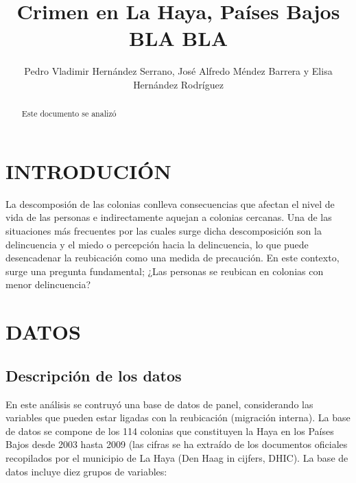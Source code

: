 \documentclass[letterpaper, 10 pt, conference]{ieeeconf}  %
\title{\LARGE \bf
Crimen en La Haya, Pa\'ises Bajos BLA BLA
}
\author{Pedro Vladimir Hern\'andez Serrano, Jos\'e Alfredo M\'endez Barrera y Elisa Hern\'andez Rodr\'iguez %
}
\begin{document}
\maketitle
\thispagestyle{empty}
\pagestyle{empty}


\begin{abstract}

Este documento se analiz\'o

\end{abstract}


\section{INTRODUCI\'ON}

La descomposi\'on de las colonias conlleva consecuencias que afectan el nivel de vida de las personas e indirectamente aquejan a colonias cercanas. Una de las situaciones m\'as frecuentes por las cuales surge dicha descomposici\'on  son la delincuencia y el miedo o percepci\'on hacia la delincuencia, lo que puede desencadenar la reubicación como una medida de precaución. En este contexto, surge una pregunta fundamental; ¿Las personas se reubican en colonias con menor delincuencia?

\section{DATOS}

\subsection{Descripci\'on de los datos}

En este an\'alisis se contruy\'o una base de datos de panel, considerando  las variables que pueden estar ligadas con la reubicaci\'on (migraci\'on interna). La base de datos se compone de los 114 colonias que constituyen la Haya en los Pa\'ises Bajos desde 2003 hasta 2009 (las cifras se ha extra\'ido de los documentos oficiales recopilados por el municipio de La Haya (Den Haag in cijfers, DHIC). La base de datos incluye diez grupos de variables: 
\end{document}
